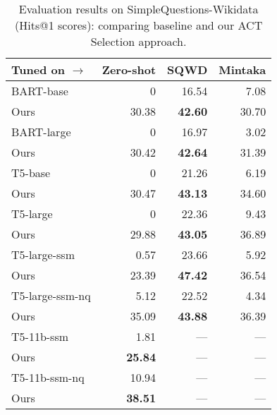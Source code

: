 \begin{table*}[ht]
    \caption{Evaluation results on SimpleQuestions-Wikidata (Hits@1 scores): comparing baseline and our ACT Selection approach.}
    \label{tab:act_selection:sqwd}
    \centering
    \begin{tabular}{lrrr}
    \hline
    Tuned on $\rightarrow$ & Zero-shot & SQWD & Mintaka \\ \hline
    BART-base      & 0      & 16.54 & 7.08  \\
    Ours           & 30.38  & \textbf{42.60} & 30.70 \\ \hline
    BART-large     & 0      & 16.97 & 3.02  \\
    Ours           & 30.42  & \textbf{42.64} & 31.39 \\ \hline
    T5-base        & 0      & 21.26 & 6.19  \\
    Ours           & 30.47  & \textbf{43.13} & 34.60 \\ \hline
    T5-large       & 0      & 22.36 & 9.43  \\
    Ours           & 29.88  & \textbf{43.05} & 36.89 \\ \hline
    T5-large-ssm   & 0.57   & 23.66 & 5.92  \\
    Ours           & 23.39  & \textbf{47.42} & 36.54 \\ \hline
    T5-large-ssm-nq & 5.12  & 22.52 & 4.34  \\
    Ours           & 35.09  & \textbf{43.88} & 36.39 \\ \hline
    T5-11b-ssm     & 1.81   & ---   & ---   \\
    Ours           & \textbf{25.84} & --- & --- \\ \hline
    T5-11b-ssm-nq  & 10.94  & ---   & ---   \\
    Ours           & \textbf{38.51} & --- & --- \\ \hline
    \end{tabular}
\end{table*}

